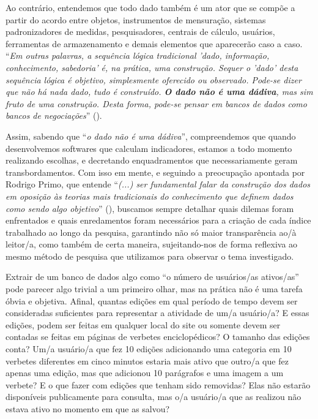 Ao contrário, entendemos que todo dado também é um ator que se compõe a partir do acordo entre objetos, instrumentos de mensuração, sistemas padronizadores de medidas, pesquisadores, centrais de cálculo, usuários, ferramentas de armazenamento e demais elementos que aparecerão caso a caso. ``\textit{Em outras palavras, a sequência lógica tradicional 'dado, informação, conhecimento, sabedoria' é, na prática, uma construção. Sequer o 'dado' desta sequência lógica é objetivo, simplesmente oferecido ou observado. Pode-se dizer que não há nada dado, tudo é construído. \textbf{O dado não é uma dádiva}, mas sim fruto de uma construção. Desta forma, pode-se pensar em bancos de dados como bancos de negociações}'' (\cite[p.171-172]{feitosa_cidadao_2010}).

Assim, sabendo que ``\textit{o dado não é uma dádiva}'', compreendemos que quando desenvolvemos softwares que calculam indicadores, estamos a todo momento realizando escolhas, e decretando enquadramentos que necessariamente geram transbordamentos. Com isso em mente, e seguindo a preocupação apontada por Rodrigo Primo, que entende ``\textit{(...) ser fundamental falar da construção dos dados em oposição às teorias mais tradicionais do conhecimento que definem dados como sendo algo objetivo}'' (\cite[p.64]{primo_o_2017}), buscamos sempre detalhar quais dilemas foram enfrentados e quais enredamentos foram necessários para a criação de cada índice trabalhado ao longo da pesquisa, garantindo não só maior transparência ao/à leitor/a, como também de certa maneira, sujeitando-nos de forma reflexiva ao mesmo método de pesquisa que utilizamos para observar o tema investigado.

Extrair de um banco de dados algo como ``o número de usuários/as ativos/as'' pode parecer algo trivial a um primeiro olhar, mas na prática não é uma tarefa óbvia e objetiva. Afinal, quantas edições em qual período de tempo devem ser consideradas suficientes para representar a atividade de um/a usuário/a? E essas edições, podem ser feitas em qualquer local do site ou somente devem ser contadas se feitas em páginas de verbetes enciclopédicos? O tamanho das edições conta? Um/a usuário/a que fez 10 edições adicionando uma categoria em 10 verbetes diferentes em cinco minutos estaria mais ativo que outro/a que fez apenas uma edição, mas que adicionou 10 parágrafos e uma imagem a um verbete? E o que fazer com edições que tenham sido removidas? Elas não estarão disponíveis publicamente para consulta, mas o/a usuário/a que as realizou não estava ativo no momento em que as salvou?

